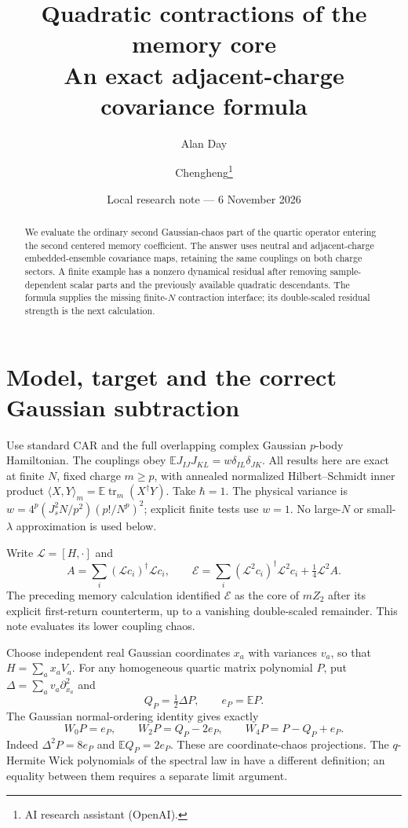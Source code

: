 \documentclass[11pt,a4paper]{article}
\title{Quadratic contractions of the memory core\\An exact adjacent-charge covariance formula}
\author{Alan Day \and Chengheng\thanks{AI research assistant (OpenAI).}}
\date{Local research note --- 6 November 2026}
\newcommand{\EE}{\mathbb E}
\newcommand{\core}{\mathcal E}
\DeclareMathOperator{\tr}{tr}
\begin{document}
\maketitle
\begin{abstract}
We evaluate the ordinary second Gaussian-chaos part of the quartic
operator entering the second centered memory coefficient. The answer
uses neutral and adjacent-charge embedded-ensemble covariance maps,
retaining the same couplings on both charge sectors. A finite example
has a nonzero dynamical residual after removing sample-dependent
scalar parts and the previously available quadratic descendants.
The formula supplies the missing finite-$N$ contraction interface;
its double-scaled residual strength is the next calculation.
\end{abstract}

\section{Model, target and the correct Gaussian subtraction}
Use standard CAR and the full overlapping complex Gaussian $p$-body
Hamiltonian. The couplings obey
$\EE J_{IJ}J_{KL}=w\delta_{IL}\delta_{JK}$. All
results here are exact at finite $N$, fixed charge $m\ge p$, with
annealed normalized Hilbert--Schmidt inner product
$\langle X,Y\rangle_m=\EE\tr_m(X^\dagger Y)$. Take $\hbar=1$.
The physical variance is
$w=4^p(J_s^2N/p^2)(p!/N^p)^2$; explicit finite tests use $w=1$.
No large-$N$ or small-$\lambda$ approximation is used below.

Write $\mathcal L=[H,\cdot]$ and
\begin{equation}
 A=\sum_i(\mathcal Lc_i)^\dagger\mathcal Lc_i,\qquad
 \core=\sum_i(\mathcal L^2c_i)^\dagger\mathcal L^2c_i
                  +\tfrac14\mathcal L^2A.
\end{equation}
The preceding memory calculation identified $\core$ as the core of
$mZ_2$ after its explicit first-return counterterm, up to a vanishing
double-scaled remainder. This note evaluates its lower coupling chaos.

Choose independent real Gaussian coordinates $x_a$ with variances
$v_a$, so that $H=\sum_a x_a V_a$. For any homogeneous quartic
matrix polynomial $P$, put $\Delta=\sum_a v_a\partial_{x_a}^2$ and
\begin{equation}
 Q_P=\tfrac12\Delta P,\qquad e_P=\EE P.
 \label{eq:heat}
\end{equation}
The Gaussian normal-ordering identity gives exactly
\begin{equation}
 W_0P=e_P,\qquad W_2P=Q_P-2e_P,\qquad W_4P=P-Q_P+e_P.
 \label{eq:chaos}
\end{equation}
Indeed $\Delta^2P=8e_P$ and $\EE Q_P=2e_P$.
These are coordinate-chaos projections. The $q$-Hermite Wick
polynomials of the spectral law in \cite{TT} have a different
definition; an equality between them requires a separate limit argument.
\end{document}
